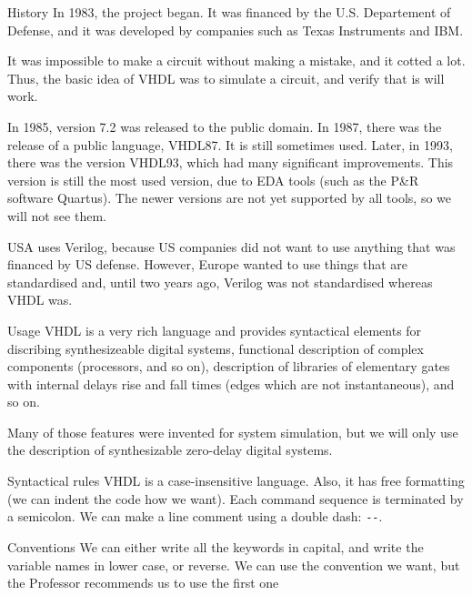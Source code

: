 \documentclass[a4paper]{article}
\begin{document}
\begin{parag}{History}
    In 1983, the project began. It was financed by the U.S. Departement of Defense, and it was developed by companies such as Texas Instruments and IBM.

    It was impossible to make a circuit without making a mistake, and it cotted a lot. Thus, the basic idea of VHDL was to simulate a circuit, and verify that is will work.

    In 1985, version 7.2 was released to the public domain. In 1987, there was the release of a public language, VHDL87. It is still sometimes used. Later, in 1993, there was the version VHDL93, which had many significant improvements. This version is still the most used version, due to EDA tools (such as the P\&R software Quartus). The newer versions are not yet supported by all tools, so we will not see them.

    USA uses Verilog, because US companies did not want to use anything that was financed by US defense. However, Europe wanted to use things that are standardised and, until two years ago, Verilog was not standardised whereas VHDL was.
\end{parag}

\begin{parag}{Usage}
    VHDL is a very rich language and provides syntactical elements for discribing synthesizeable digital systems, functional description of complex components (processors, and so on), description of libraries of elementary gates with internal delays rise and fall times (edges which are not instantaneous), and so on.

    Many of those features were invented for system simulation, but we will only use the description of synthesizable zero-delay digital systems.
\end{parag}

\begin{parag}{Syntactical rules}
    VHDL is a case-insensitive language. Also, it has free formatting (we can indent the code how we want). Each command sequence is terminated by a semicolon. We can make a line comment using a double dash: \texttt{-{}-}.
\end{parag}

\begin{parag}{Conventions}
    We can either write all the keywords in capital, and write the variable names in lower case, or reverse. We can use the convention we want, but the Professor recommends us to use the first one
\end{parag}
\end{document}
